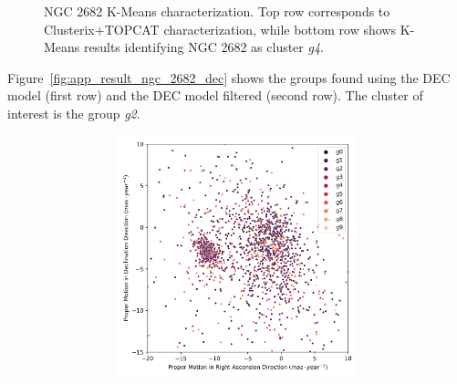 \documentclass[11pt,a4paper,english,twocolumn]{article}
\begin{document}
\begin{figure}[htbp]
\begin{subfigure}{\columnwidth}
\begin{subfigure}[t]{0.30\textwidth}
    \end{subfigure}
  \end{subfigure}
  \caption{NGC 2682 K-Means characterization.
           Top row corresponds to Clusterix+TOPCAT characterization,
           while bottom row shows K-Means results identifying
           NGC 2682 as cluster \emph{g4}.}
  \label{fig:app_result_ngc_2682_clusterix_kmeans}
\end{figure}

Figure~\ref{fig:app_result_ngc_2682_dec} shows the groups found using
the DEC model (first row) and the DEC model filtered (second row).
The cluster of interest is the group \emph{g2}.

\begin{figure}[htbp]
  \centering
  \begin{subfigure}{\columnwidth}
    \centering
    \begin{subfigure}[t]{0.30\textwidth}
      \centering
      \includegraphics[width=\textwidth]{../figures/ngc_2682/dec_pm_ngc_2682.png}
    \end{subfigure}
    \hfill
    \begin{subfigure}[t]{0.30\textwidth}
      \centering

\end{subfigure}
\end{subfigure}
\end{figure}
\end{document}

